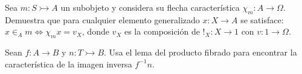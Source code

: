 \begin{exercise}[teca=1]
  Sea \(m\colon S\rightarrowtail A\) un subobjeto y considera su flecha
  característica \(\chi_m\colon A\to \Omega\). Demuestra que para
  cualquier elemento generalizado \(x\colon X\to A\) se satisface: \( x\in_A m \iff \chi_m x = v_X \), donde \(v_X\) es la composición de \(!_X\colon X\to 1\) con \(v\colon 1\to \Omega\).
\end{exercise}

\begin{exercise}
  Sean \(f\colon A\to B\) y \(n\colon T\rightarrowtail B\). Usa el lema
  del producto fibrado para encontrar la característica de la imagen
  inversa \(f^{-1}n\).
\end{exercise}